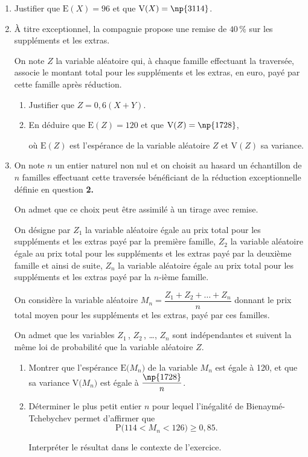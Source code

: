 	\begin{enumerate}
		\item Justifier que \quad $\mathrm{E}(X)=96$ \quad et que \quad $\mathrm{V}(X)=\np{3114}$.

		\item À titre exceptionnel, la compagnie propose une remise de $40\,\%$ sur les suppléments et les extras.

		On note $Z$ la variable aléatoire qui, à chaque famille effectuant la traversée, associe le montant total pour les suppléments et les extras, en euro, payé par cette famille après réduction.

		\begin{enumerate}
			\item Justifier que \quad $Z = 0,6(X + Y)$.
			\item En déduire que \quad $\mathrm{E}(Z)=120$ \quad et que \quad $\mathrm{V}(Z)=\np{1728}$,

			où $\mathrm{E}(Z)$ est l'espérance de la variable aléatoire $Z$ et $\mathrm{V}(Z)$ sa variance.
		\end{enumerate}

		\item On note $n$ un entier naturel non nul et on choisit au hasard un échantillon de $n$ familles effectuant cette traversée bénéficiant de la réduction exceptionnelle définie en question \textbf{2.}

		On admet que ce choix peut être assimilé à un tirage avec remise.

		On désigne par $Z_{1}$ la variable aléatoire égale au prix total pour les suppléments et les extras payé par la première famille, $Z_{2}$ la variable aléatoire égale au prix total pour les suppléments et les extras payé par la deuxième famille et ainsi de suite, $Z_{n}$ la variable aléatoire égale au prix total pour les suppléments et les extras payé par la $n$-ième famille.

		On considère la variable aléatoire \quad $M_{n}=\dfrac{Z_{1}+Z_{2}+\ldots+Z_{n}}{n}$ \quad donnant le prix total moyen pour les suppléments et les extras, payé par ces familles.

		On admet que les variables $Z_{1}$\,, $Z_{2}$\,, \ldots, $Z_{n}$ sont indépendantes et suivent la même loi de probabilité que la variable aléatoire $Z$.

		\begin{enumerate}
			\item Montrer que l'espérance $\mathrm{E}\big(M_{n}\big)$ de la variable $M_{n}$ est égale à 120, et que sa variance $\mathrm{V}\big(M_{n}\big)$ est égale à $\dfrac{\np{1728}}{n}$.

			\item Déterminer le plus petit entier $n$ pour lequel l'inégalité de Bienaymé-Tchebychev permet d'affirmer que \[\mathrm{P}\big(114<M_{n}<126\big) \geqslant 0,85.\]

			Interpréter le résultat dans le contexte de l'exercice.
		\end{enumerate}
	\end{enumerate}
